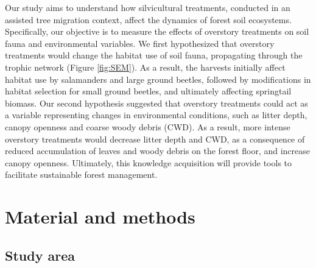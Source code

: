 Our study aims to understand how silvicultural treatments, conducted in an assisted tree migration context, affect the dynamics of forest soil ecosystems. 
Specifically, our objective is to measure the effects of overstory treatments on soil fauna and environmental variables.
We first hypothesized that overstory treatments would change the habitat use of soil fauna, propagating through the trophic network (Figure \ref*{fig:SEM}). 
As a result, the harvests initially affect habitat use by salamanders and large ground beetles, followed by modifications in habitat selection for small ground beetles, and ultimately affecting springtail biomass.
Our second hypothesis suggested that overstory treatments could act as a variable representing changes in environmental conditions, such as litter depth, canopy openness and coarse woody debris (CWD). 
As a result, more intense overstory treatments would decrease litter depth and CWD, as a consequence of reduced accumulation of leaves and woody debris on the forest floor, and increase canopy openness. 
Ultimately, this knowledge acquisition will provide tools to facilitate sustainable forest management.

\section*{Material and methods}
\label{sec:matmet1}

\subsection*{Study area}
\label{subsec:area}

